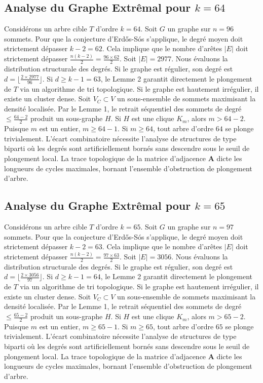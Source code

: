 \documentclass[11pt,a4paper]{article}
\begin{document}
\subsection{Analyse du Graphe Extr\^emal pour $k=64$}
Consid\'erons un arbre cible $T$ d'ordre $k=64$.
Soit $G$ un graphe sur $n=96$ sommets.
Pour que la conjecture d'Erd\H{o}s-S\'os s'applique, le degr\'e moyen doit strictement d\'epasser $k-2 = 62$.
Cela implique que le nombre d'ar\^etes $|E|$ doit strictement d\'epasser $\frac{n(k-2)}{2} = \frac{96 \times 62}{2}$.
Soit $|E| = 2977$.
Nous \'evaluons la distribution structurale des degr\'es. Si le graphe est r\'egulier, son degr\'e est $d = \lfloor \frac{2 \times 2977}{96} \rfloor$.
Si $d \geq k-1 = 63$, le Lemme 2 garantit directement le plongement de $T$ via un algorithme de tri topologique.
Si le graphe est hautement irr\'egulier, il existe un cluster dense. Soit $V_C \subset V$ un sous-ensemble de sommets maximisant la densit\'e localis\'ee.
Par le Lemme 1, le retrait s\'equentiel des sommets de degr\'e $\leq \frac{64-2}{2}$ produit un sous-graphe $H$.
Si $H$ est une clique $K_{m}$, alors $m > 64-2$. Puisque $m$ est un entier, $m \geq 64-1$. Si $m \geq 64$, tout arbre d'ordre $64$ se plonge trivialement.
L'\'ecart combinatoire n\'ecessite l'analyse de structures de type biparti o\`u les degr\'es sont artificiellement born\'es sans descendre sous le seuil de plongement local. La trace topologique de la matrice d'adjacence $\mathbf{A}$ dicte les longueurs de cycles maximales, bornant l'ensemble d'obstruction de plongement d'arbre.


\subsection{Analyse du Graphe Extr\^emal pour $k=65$}
Consid\'erons un arbre cible $T$ d'ordre $k=65$.
Soit $G$ un graphe sur $n=97$ sommets.
Pour que la conjecture d'Erd\H{o}s-S\'os s'applique, le degr\'e moyen doit strictement d\'epasser $k-2 = 63$.
Cela implique que le nombre d'ar\^etes $|E|$ doit strictement d\'epasser $\frac{n(k-2)}{2} = \frac{97 \times 63}{2}$.
Soit $|E| = 3056$.
Nous \'evaluons la distribution structurale des degr\'es. Si le graphe est r\'egulier, son degr\'e est $d = \lfloor \frac{2 \times 3056}{97} \rfloor$.
Si $d \geq k-1 = 64$, le Lemme 2 garantit directement le plongement de $T$ via un algorithme de tri topologique.
Si le graphe est hautement irr\'egulier, il existe un cluster dense. Soit $V_C \subset V$ un sous-ensemble de sommets maximisant la densit\'e localis\'ee.
Par le Lemme 1, le retrait s\'equentiel des sommets de degr\'e $\leq \frac{65-2}{2}$ produit un sous-graphe $H$.
Si $H$ est une clique $K_{m}$, alors $m > 65-2$. Puisque $m$ est un entier, $m \geq 65-1$. Si $m \geq 65$, tout arbre d'ordre $65$ se plonge trivialement.
L'\'ecart combinatoire n\'ecessite l'analyse de structures de type biparti o\`u les degr\'es sont artificiellement born\'es sans descendre sous le seuil de plongement local. La trace topologique de la matrice d'adjacence $\mathbf{A}$ dicte les longueurs de cycles maximales, bornant l'ensemble d'obstruction de plongement d'arbre.
\end{document}

